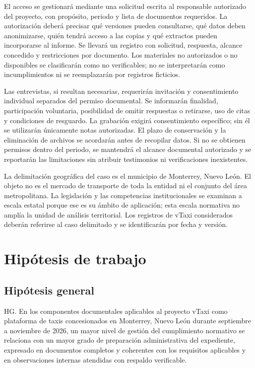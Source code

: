 {El acceso se gestionará mediante una solicitud escrita al responsable autorizado del proyecto, con propósito, periodo y lista de documentos requeridos. La autorización deberá precisar qué versiones pueden consultarse, qué datos deben anonimizarse, quién tendrá acceso a las copias y qué extractos pueden incorporarse al informe. Se llevará un registro con solicitud, respuesta, alcance concedido y restricciones por documento. Los materiales no autorizados o no disponibles se clasificarán como no verificables; no se interpretarán como incumplimientos ni se reemplazarán por registros ficticios.


Las entrevistas, si resultan necesarias, requerirán invitación y consentimiento individual separados del permiso documental. Se informarán finalidad, participación voluntaria, posibilidad de omitir respuestas o retirarse, uso de citas y condiciones de resguardo. La grabación exigirá consentimiento específico; sin él se utilizarán únicamente notas autorizadas. El plazo de conservación y la eliminación de archivos se acordarán antes de recopilar datos. Si no se obtienen permisos dentro del periodo, se mantendrá el alcance documental autorizado y se reportarán las limitaciones sin atribuir testimonios ni verificaciones inexistentes.


La delimitación geográfica del caso es el municipio de Monterrey, Nuevo León. El objeto no es el mercado de transporte de toda la entidad ni el conjunto del área metropolitana. La legislación y las competencias institucionales se examinan a escala estatal porque ese es su ámbito de aplicación; esta escala normativa no amplía la unidad de análisis territorial. Los registros de vTaxi considerados deberán referirse al caso delimitado y se identificarán por fecha y versión.


\section{Hipótesis de trabajo}
\subsection{Hipótesis general}
HG. En los componentes documentales aplicables al proyecto vTaxi como plataforma de taxis concesionados en Monterrey, Nuevo León durante septiembre a noviembre de 2026, un mayor nivel de gestión del cumplimiento normativo se relaciona con un mayor grado de preparación administrativa del expediente, expresado en documentos completos y coherentes con los requisitos aplicables y en observaciones internas atendidas con respaldo verificable.


}
